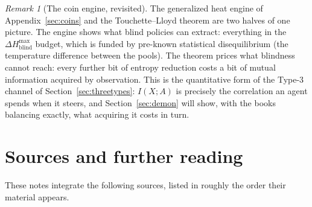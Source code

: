 \documentclass[10pt]{article}
\theoremstyle{definition}
\theoremstyle{remark}
\newtheorem{remark}[theorem]{Remark}
\begin{document}
\begin{remark}[The coin engine, revisited]
The generalized heat engine of Appendix~\ref{sec:coins} and the Touchette--Lloyd theorem are two halves of one picture. The engine shows what blind policies can extract: everything in the $\Delta H^{\max}_{\text{blind}}$ budget, which is funded by pre-known statistical disequilibrium (the temperature difference between the pools). The theorem prices what blindness cannot reach: every further bit of entropy reduction costs a bit of mutual information acquired by observation. This is the quantitative form of the Type-3 channel of Section~\ref{sec:threetypes}: $I(X;A)$ is precisely the correlation an agent spends when it steers, and Section~\ref{sec:demon} will show, with the books balancing exactly, what acquiring it costs in turn.
\end{remark}

\section*{Sources and further reading}

These notes integrate the following sources, listed in roughly the order their material appears.
\end{document}
